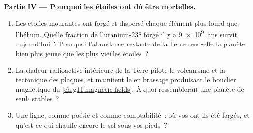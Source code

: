 \begin{problem}
\medskip
\noindent\textbf{Partie IV --- Pourquoi les étoiles ont dû être mortelles.}
\begin{enumerate}[resume]
  \item Les étoiles mourantes ont forgé et dispersé chaque élément plus
        lourd que l'hélium. Quelle fraction de l'uranium-238 forgé il y
        a \num{9e9}~ans survit aujourd'hui~? Pourquoi l'abondance
        restante de la Terre rend-elle la planète bien plus jeune que
        les plus vieilles étoiles~?
  \item La chaleur radioactive intérieure de la Terre pilote le
        volcanisme et la tectonique des plaques, et maintient le 
        en brassage produisant le bouclier magnétique du
        \cref{ch:g11:magnetic-fields}. À quoi ressemblerait une planète
        de seuls 
        stables~?
  \item Une ligne, comme poésie et comme comptabilité~: où vos
         ont-ils été
        forgés, et qu'est-ce qui chauffe encore le sol sous vos pieds~?
\end{enumerate}
\end{problem}
